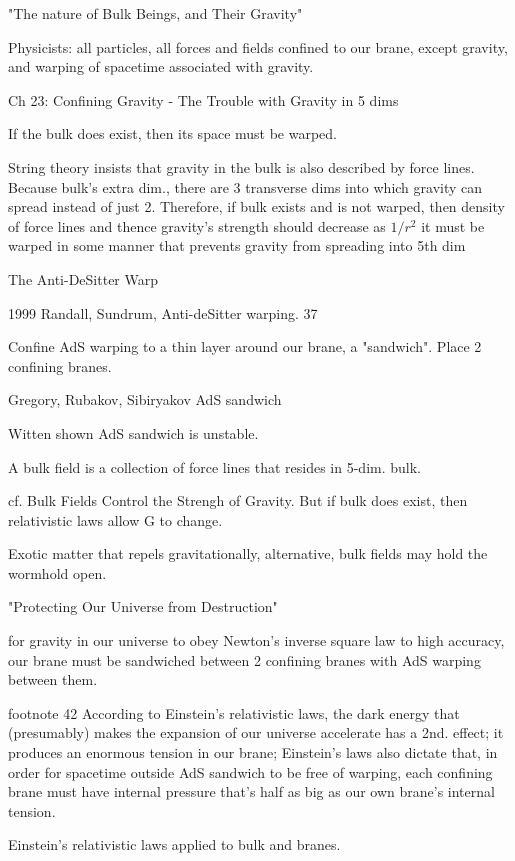 \documentclass[10pt]{amsart}
\begin{document}
"The nature of Bulk Beings, and Their Gravity"

Physicists: all particles, all forces and fields confined to our brane, except gravity, and warping of spacetime associated with gravity.

Ch 23: Confining Gravity - The Trouble with Gravity in 5 dims

If the bulk does exist, then its space must be warped.

String theory insists that gravity in the bulk is also described by force lines.
Because bulk's extra dim., there are 3 transverse dims into which gravity can spread instead of just 2.
Therefore, if bulk exists and is not warped, then density of force lines and thence gravity's strength should decrease as $1/r^2$
it must be warped in some manner that prevents gravity from spreading into 5th dim

The Anti-DeSitter Warp

1999 Randall, Sundrum, Anti-deSitter warping. 37

Confine AdS warping to a thin layer around our brane, a "sandwich". Place 2 confining branes. 

Gregory, Rubakov, Sibiryakov AdS sandwich

Witten shown AdS sandwich is unstable.

A bulk field is a collection of force lines that resides in 5-dim. bulk.

cf. Bulk Fields Control the Strengh of Gravity. But if bulk does exist, then relativistic laws allow G to change.

Exotic matter that repels gravitationally,
alternative, bulk fields may hold the wormhold open.

"Protecting Our Universe from Destruction"

for gravity in our universe to obey Newton's inverse square law to high accuracy, our brane must be sandwiched between 2 confining branes with AdS warping between them.

footnote 42 
According to Einstein's relativistic laws, the dark energy that (presumably) makes the expansion of our universe accelerate has a 2nd. effect; it produces an enormous tension in our brane; Einstein's laws also dictate that, in order for spacetime outside AdS sandwich to be free of warping, each confining brane must have internal pressure that's half as big as our own brane's internal tension.

Einstein's relativistic laws applied to bulk and branes.
\end{document}
